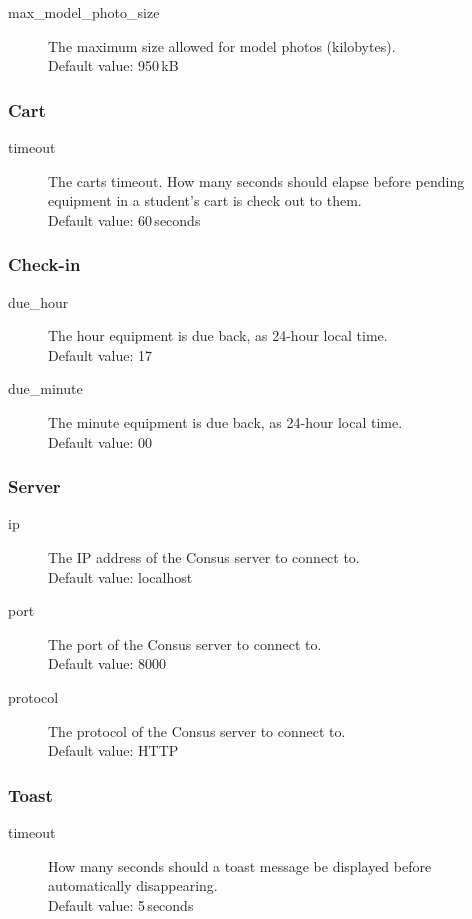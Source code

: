 \begin{description}
  \item[max\_model\_photo\_size] The maximum size allowed for model photos (kilobytes).\\
    Default value: 950\,kB
\end{description}

\subsubsection{Cart}
\label{subsubsec:client_config_cart}

\begin{description}
  \item[timeout] The carts timeout.
    How many seconds should elapse before pending equipment in a student's cart is check out to them.\\
    Default value: 60\,seconds
\end{description}

\subsubsection{Check-in}
\label{subsubsec:client_config_checkin}

\begin{description}
  \item[due\_hour] The hour equipment is due back, as 24-hour local time.\\
    Default value: 17
  \item[due\_minute] The minute equipment is due back, as 24-hour local time.\\
    Default value: 00
\end{description}

\subsubsection{Server}
\label{subsubsec:client_config_server}

\begin{description}
  \item[ip] The IP address of the Consus server to connect to.\\
    Default value: localhost
  \item[port] The port of the Consus server to connect to.\\
    Default value: 8000
  \item[protocol] The protocol of the Consus server to connect to.\\
    Default value: HTTP
\end{description}

\subsubsection{Toast}
\label{subsubsec:client_config_toast}

\begin{description}
  \item[timeout] How many seconds should a toast message be displayed before automatically disappearing.\\
    Default value: 5\,seconds
\end{description}

